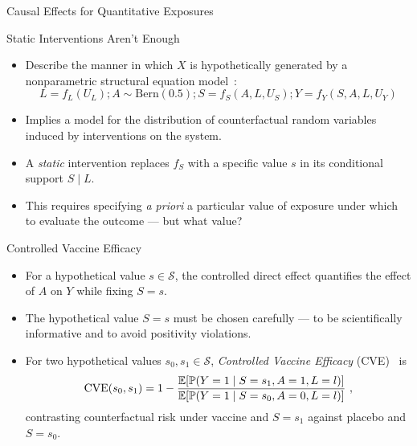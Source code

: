 \documentclass{beamer}
\begin{document}
\begin{frame}[standout]
  Causal Effects for Quantitative Exposures
\end{frame}


\begin{frame}[c]{Static Interventions Aren't Enough}

\begin{center}
\begin{itemize}
  \itemsep8pt
  \item Describe the manner in which $X$ is hypothetically generated by a
    nonparametric structural equation model~\citep{pearl2009causality}:
    \begin{equation*}
      L = f_L(U_L); A \sim \text{Bern}(0.5);
      S = f_S(A, L, U_S); Y = f_Y(S, A, L, U_Y)
    \end{equation*}
  \item Implies a model for the distribution of counterfactual random variables
    induced by interventions on the system.
  \item A \textit{static} intervention replaces $f_S$ with a specific value $s$
    in its conditional support $S \mid L$.
  \item This requires specifying \textit{a priori} a particular value of
    exposure under which to evaluate the outcome --- but what value?
\end{itemize}
\end{center}

\note{
}

\end{frame}


\begin{frame}[c]{Controlled Vaccine Efficacy}

\begin{center}
\begin{itemize}
  \itemsep8pt
  \item For a hypothetical value $s \in \mathcal{S}$, the controlled direct
    effect quantifies the effect of $A$ on $Y$ while fixing $S = s$.
  \item The hypothetical value $S = s$ must be chosen carefully --- to
    be scientifically informative and to avoid positivity violations.
  \item For two hypothetical values $s_0, s_1 \in \mathcal{S}$,
    \textit{Controlled Vaccine Efficacy} (CVE)~\citep{gilbert2022controlled} is
  \begin{equation*}
    \text{CVE}(s_0, s_1) = 1 -
      \frac{\mathbb{E}[\mathbb{P}(Y = 1 \mid S = s_1, A = 1, L = l)]}
      {\mathbb{E}[\mathbb{P}(Y = 1 \mid S = s_0, A = 0, L = l)]} \ ,
  \end{equation*}
  contrasting counterfactual risk under vaccine and $S = s_1$ against placebo
  and $S = s_0$.
\end{itemize}
\end{center}

\note{
}

\end{frame}
\end{document}
